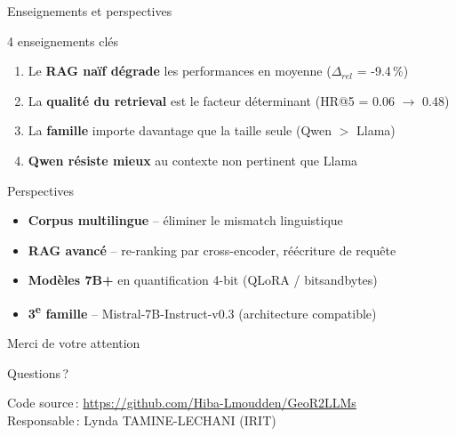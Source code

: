 \documentclass[aspectratio=169, 12pt]{beamer}
\begin{document}
\begin{frame}{Enseignements et perspectives}
  \begin{block}{4 enseignements cl\'es}
    \begin{enumerate}
      \item Le \textbf{RAG na\"if d\'egrade} les performances en moyenne ($\Delta_{rel}$ = -9.4\,\%)
      \item La \textbf{qualit\'e du retrieval} est le facteur d\'eterminant (HR@5 = 0.06 $\to$ 0.48)
      \item La \textbf{famille} importe davantage que la taille seule (Qwen $>$ Llama)
      \item \textbf{Qwen r\'esiste mieux} au contexte non pertinent que Llama
    \end{enumerate}
  \end{block}

  \vspace{0.15cm}

  \begin{block}{Perspectives}
    \begin{itemize}
      \item \textbf{Corpus multilingue} -- \'eliminer le mismatch linguistique
      \item \textbf{RAG avanc\'e} -- re-ranking par cross-encoder, r\'e\'ecriture de requ\^ete
      \item \textbf{Mod\`eles 7B+} en quantification 4-bit (QLoRA / bitsandbytes)
      \item \textbf{3\textsuperscript{e} famille} -- Mistral-7B-Instruct-v0.3 (architecture compatible)
    \end{itemize}
  \end{block}
\end{frame}

\begin{frame}[plain]
  \centering
  \vspace{2cm}
  {\Huge\color{upblue} Merci de votre attention}

  \vspace{1.5cm}

  {\large Questions\,?}

  \vspace{1.5cm}

  \small
  Code source\,: \url{https://github.com/Hiba-Lmoudden/GeoR2LLMs}\\
  Responsable\,: Lynda TAMINE-LECHANI (IRIT)
\end{frame}
\end{document}
